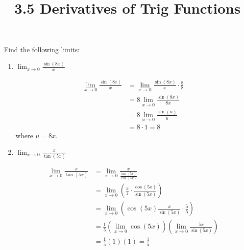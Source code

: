 \documentclass[nooutcomes]{ximera}
\title{3.5 Derivatives of Trig Functions}
\begin{document}
\begin{abstract}		\end{abstract}
\maketitle


\begin{problem}
Find the following limits:

	\begin{enumerate}
	
	\item  $\lim_{x \to 0} \frac{\sin(8x)}{x}$
			\begin{freeResponse}
			\begin{align*}
			\lim_{x \to 0} \frac{\sin(8x)}{x} &= \lim_{x \to 0} \frac{\sin(8x)}{x} \cdot \frac{8}{8}  \\
			&= 8 \lim_{x \to 0} \frac{\sin(8x)}{8x}  \\
			&= 8 \lim_{u \to 0} \frac{\sin(u)}{u}  \\
			&= 8 \cdot 1 = 8
			\end{align*}
			where $u = 8x$.  
			\end{freeResponse}
			
	
	\item  $\lim_{x \to 0} \frac{x}{\tan(5x)}$
			\begin{freeResponse}
			\begin{align*}
			\lim_{x \to 0} \frac{x}{\tan(5x)} &= \lim_{x \to 0} \frac{x}{\frac{\sin(5x)}{\cos(5x)}}  \\
			&= \lim_{x \to 0} \left( \frac{x}{1} \cdot \frac{\cos(5x)}{\sin(5x)} \right)  \\
			&= \lim_{x \to 0} \left( \cos(5x) \frac{x}{\sin(5x)} \cdot \frac{5}{5} \right)  \\
			&= \frac{1}{5} \left( \lim_{x \to 0} \cos(5x) \right) \left( \lim_{x \to 0} \frac{5x}{\sin(5x)} \right)  \\
			&= \frac{1}{5} (1) (1) = \frac{1}{5}
			\end{align*}
			\end{freeResponse}
			
			
			
	\end{enumerate}
\end{problem}
	
\end{document}
